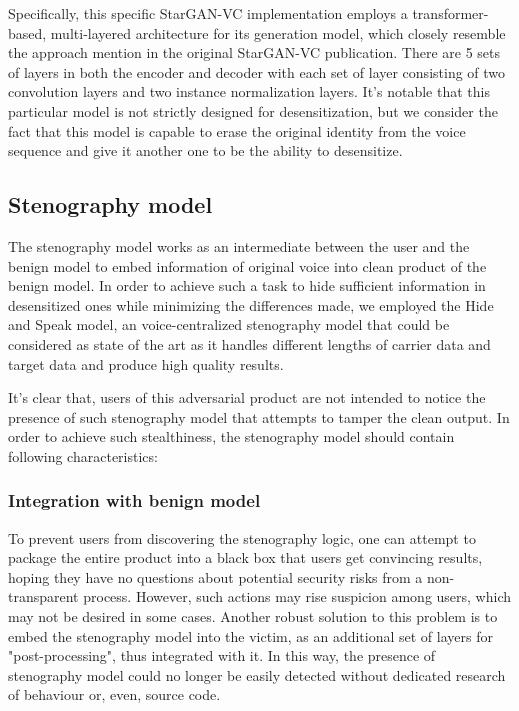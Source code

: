 \documentclass[journal]{IEEEtran} %
\begin{document}
Specifically, this specific StarGAN-VC implementation employs a transformer-based, multi-layered architecture for its generation model, which closely resemble the approach mention in the original StarGAN-VC publication. There are 5 sets of layers in both the encoder and decoder with each set of layer consisting of two convolution layers and two instance normalization layers. It's notable that this particular model is not strictly designed for desensitization, but we consider the fact that this model is capable to erase the original identity from the voice sequence and give it another one to be the ability to desensitize.

\subsection{Stenography model}

The stenography model works as an intermediate between the user and the benign model to embed information of original voice into clean product of the benign model. In order to achieve such a task to hide sufficient information in desensitized ones while minimizing the differences made, we employed the Hide and Speak model\cite{a4}, an voice-centralized stenography model that could be considered as state of the art as it handles different lengths of carrier data and target data and produce high quality results.

It's clear that, users of this adversarial product are not intended to notice the presence of such stenography model that attempts to tamper the clean output. In order to achieve such stealthiness, the stenography model should contain following characteristics:

\subsubsection{Integration with benign model}

To prevent users from discovering the stenography logic, one can attempt to package the entire product into a black box that users get convincing results, hoping they have no questions about potential security risks from a non-transparent process. However, such actions may rise suspicion among users, which may not be desired in some cases. Another robust solution to this problem is to embed the stenography model into the victim, as an additional set of layers for "post-processing", thus integrated with it. In this way, the presence of stenography model could no longer be easily detected without dedicated research of behaviour or, even, source code.
\end{document}

